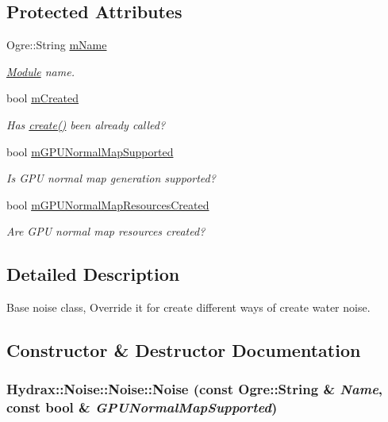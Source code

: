 \subsection*{Protected Attributes}
\begin{CompactItemize}
\item 
Ogre::String \hyperlink{class_hydrax_1_1_noise_1_1_noise_aedee8210b700f1ee80c660a38973b14}{mName}
\begin{CompactList}\small\item\em \hyperlink{namespace_hydrax_1_1_module}{Module} name. \item\end{CompactList}\item 
bool \hyperlink{class_hydrax_1_1_noise_1_1_noise_7a0bdaab63fa4a2feec69afe5be5ab19}{mCreated}
\begin{CompactList}\small\item\em Has \hyperlink{class_hydrax_1_1_noise_1_1_noise_be9cf8765feed765e6a35b0779125f6a}{create()} been already called? \item\end{CompactList}\item 
bool \hyperlink{class_hydrax_1_1_noise_1_1_noise_ce28ba855518ef99599c1ac4a7512446}{mGPUNormalMapSupported}
\begin{CompactList}\small\item\em Is GPU normal map generation supported? \item\end{CompactList}\item 
bool \hyperlink{class_hydrax_1_1_noise_1_1_noise_8c140b20c56920d4dd99204dff093ac2}{mGPUNormalMapResourcesCreated}
\begin{CompactList}\small\item\em Are GPU normal map resources created? \item\end{CompactList}\end{CompactItemize}


\subsection{Detailed Description}
Base noise class, Override it for create different ways of create water noise. 

\subsection{Constructor \& Destructor Documentation}
\hypertarget{class_hydrax_1_1_noise_1_1_noise_18d24fbe43250f986c5d5c57e1780f19}{
\subsubsection[{Noise}]{\setlength{\rightskip}{0pt plus 5cm}Hydrax::Noise::Noise::Noise (const Ogre::String \& {\em Name}, \/  const bool \& {\em GPUNormalMapSupported})}}
\label{class_hydrax_1_1_noise_1_1_noise_18d24fbe43250f986c5d5c57e1780f19}


